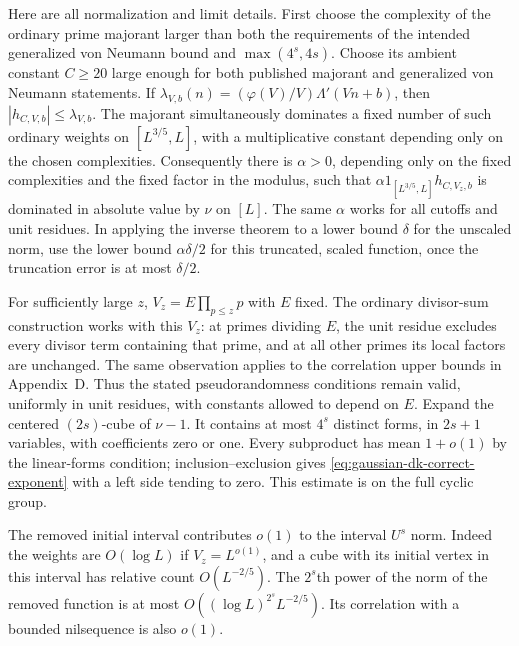 Here are all normalization and limit details. First choose the complexity
of the ordinary prime majorant larger than both the requirements of the
intended generalized von Neumann bound and
$\max(4^s,4s)$. Choose its ambient constant $C\geq20$ large enough for
both published majorant and generalized von Neumann statements. If
$\lambda_{V,b}(n)=(\varphi(V)/V)\Lambda'(Vn+b)$, then
$|h_{C,V,b}|\leq\lambda_{V,b}$. The majorant simultaneously dominates
a fixed number of such ordinary weights on $[L^{3/5},L]$, with a
multiplicative constant depending only on the chosen complexities.
Consequently there is $\alpha>0$, depending only on the fixed
complexities and the fixed factor in the modulus, such that
$\alpha 1_{[L^{3/5},L]}h_{C,V_z,b}$ is dominated in absolute value by
$\nu$ on $[L]$. The same $\alpha$ works for all cutoffs and unit residues.
In applying the inverse theorem to a lower bound $\delta$ for the
unscaled norm, use the lower bound $\alpha\delta/2$ for this truncated,
scaled function, once the truncation error is at most $\delta/2$.

For sufficiently large $z$, $V_z=E\prod_{p\leq z}p$ with $E$ fixed.
The ordinary divisor-sum construction works with this $V_z$: at primes
dividing $E$, the unit residue excludes every divisor term containing
that prime, and at all other primes its local factors are unchanged.
The same observation applies to the correlation upper bounds in
Appendix~D. Thus the stated pseudorandomness conditions remain valid,
uniformly in unit residues, with constants allowed to depend on $E$.
Expand the centered $(2s)$-cube of $\nu-1$. It contains at most $4^s$
distinct forms, in $2s+1$ variables, with coefficients zero or one.
Every subproduct has mean $1+o(1)$ by the linear-forms condition;
inclusion--exclusion gives \eqref{eq:gaussian-dk-correct-exponent} with
a left side tending to zero. This estimate is on the full cyclic group.

The removed initial interval contributes $o(1)$ to the interval $U^s$
norm. Indeed the weights are $O(\log L)$ if $V_z=L^{o(1)}$, and a cube
with its initial vertex in this interval has relative count
$O(L^{-2/5})$. The $2^s$th power of the norm of the removed function is
at most $O((\log L)^{2^s}L^{-2/5})$. Its correlation with a bounded
nilsequence is also $o(1)$.

